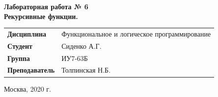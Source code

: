 \documentclass[a4paper,14pt]{extreport} %
\begin{document}
\begin{titlepage}
    \vspace{2cm}

    \begin{center}
        \textbf{Лабораторная работа № 6} \\
        \vspace{0.5cm}
        \textbf{Рекурсивные функции.  } \\
    \end{center}

    \vspace{4cm}

    \begin{flushleft}
        \begin{tabular}{ll}
            \textbf{Дисциплина} & Функциональное и логическое программирование \\
            \textbf{Студент} & Сиденко А.Г. \\
            \textbf{Группа} & ИУ7-63Б \\
            \textbf{Преподаватель} & Толпинская Н.Б.  \\
        \end{tabular}
    \end{flushleft}

    \vspace{4cm}

   \begin{center}
        Москва, 2020 г.
    \end{center}

\end{titlepage}
\end{document}
